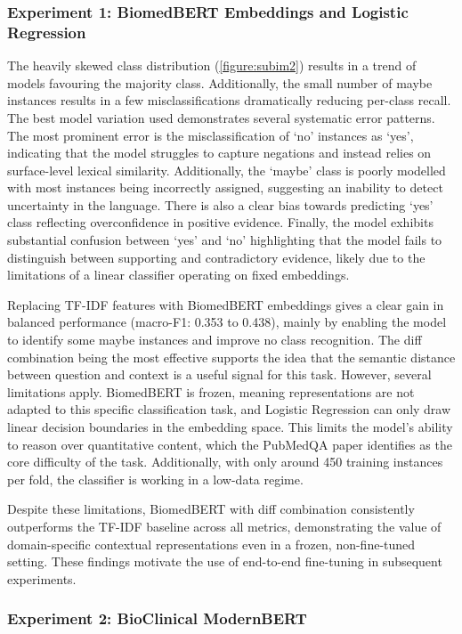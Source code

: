 \documentclass[11pt]{article}
\begin{document}
\subsubsection{Experiment 1: BiomedBERT Embeddings and Logistic Regression}
The heavily skewed class distribution (\ref{figure:subim2}) results in a trend of models favouring the majority class. Additionally, the small number of maybe instances results in a few misclassifications dramatically reducing per-class recall. 
The best model variation used demonstrates several systematic error patterns. The most prominent error is the misclassification of ‘no’ instances as ‘yes’, indicating that the model struggles to capture negations and instead relies on surface-level lexical similarity. Additionally, the ‘maybe’ class is poorly modelled with most instances being incorrectly assigned, suggesting an inability to detect uncertainty in the language. There is also a clear bias towards predicting ‘yes’ class reflecting overconfidence in positive evidence. Finally, the model exhibits substantial confusion between ‘yes’ and ‘no’ highlighting that the model fails to distinguish between supporting and contradictory evidence, likely due to the limitations of a linear classifier operating on fixed embeddings. \par
Replacing TF-IDF features with BiomedBERT embeddings gives a clear gain in balanced performance (macro-F1: 0.353 to 0.438), mainly by enabling the model to identify some maybe instances and improve no class recognition. The diff combination being the most effective supports the idea that the semantic distance between question and context is a useful signal for this task.
However, several limitations apply. BiomedBERT is frozen, meaning representations are not adapted to this specific classification task, and Logistic Regression can only draw linear decision boundaries in the embedding space. This limits the model’s ability to reason over quantitative content, which the PubMedQA paper identifies as the core difficulty of the task. Additionally, with only around 450 training instances per fold, the classifier is working in a low-data regime. \par
Despite these limitations, BiomedBERT with diff combination consistently outperforms the TF-IDF baseline across all metrics, demonstrating the value of domain-specific contextual representations even in a frozen, non-fine-tuned setting. These findings motivate the use of end-to-end fine-tuning in subsequent experiments. 

\subsubsection{Experiment 2: BioClinical ModernBERT} 
\end{document}
